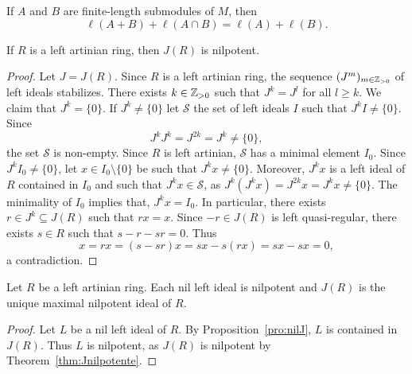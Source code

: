 
\begin{exercise}
	If $A$ and $B$ are finite-length submodules of $M$, then  
	\[
	\ell(A+B)+\ell(A\cap B)=\ell(A)+\ell(B).
	\]
\end{exercise}

\begin{theorem}
	\label{thm:Jnilpotente}
	If $R$ is a left artinian ring, then $J(R)$ is nilpotent. 
\end{theorem}

\begin{proof}
	Let $J=J(R)$. Since $R$ is a left artinian ring, the sequence 
	$(J^m)_{m\in\mathbb{Z}_{>0}}$ of left ideals stabilizes. There exists 
	$k\in\mathbb{Z}_{>0}$ such that $J^k=J^l$ for all $l\geq k$. We claim that $J^k=\{0\}$. If
	$J^k\ne\{0\}$ let $\mathcal{S}$ the set of left ideals 
	$I$ such that $J^kI\ne\{0\}$. Since 
	\[
	J^kJ^k=J^{2k}=J^k\ne\{0\},
	\]
	the set $\mathcal{S}$ is non-empty. 
	Since $R$ is left artinian, $\mathcal{S}$ has a minimal element $I_0$. Since $J^kI_0\ne\{0\}$, let $x\in
	I_0\setminus\{0\}$ be such that $J^kx\ne\{0\}$. Moreover, $J^kx$ is a left ideal of $R$ 
	contained in $I_0$ and such that $J^kx\in\mathcal{S}$, as 
	$J^k(J^kx)=J^{2k}x=J^kx\ne\{0\}$. The minimality of $I_0$ implies that, $J^kx=I_0$. In particular, 
	there exists $r\in J^k\subseteq J(R)$ such that $rx=x$. Since $-r\in
	J(R)$ is left quasi-regular, there exists $s\in R$ such that $s-r-sr=0$.
	Thus 
	\[
		x=rx=(s-sr)x=sx-s(rx)=sx-sx=0,
	\]
	a contradiction.
\end{proof}

\begin{corollary}
	Let $R$ be a left artinian ring. Each nil left ideal is nilpotent and 
	$J(R)$ is the unique maximal nilpotent ideal of $R$. 
\end{corollary}

\begin{proof}
	Let $L$ be a nil left ideal of $R$. By Proposition~\ref{pro:nilJ}, $L$
	is contained in $J(R)$. Thus $L$ is nilpotent, as $J(R)$ 
	is nilpotent by Theorem~\ref{thm:Jnilpotente}. 
\end{proof}


